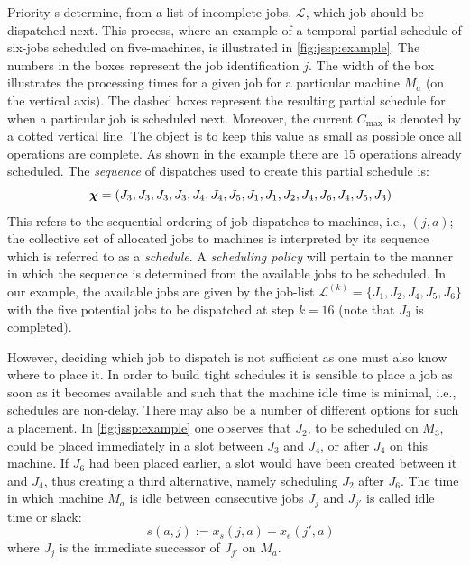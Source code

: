 \documentclass[twocolumn]{svjour3}
\begin{document}
Priority \dr s determine, from a list of incomplete jobs, 
$\mathcal{L}$, which job should be dispatched next. This process, where an 
example of 
a temporal partial schedule of six-jobs scheduled on five-machines, is 
illustrated in \cref{fig:jssp:example}.
The numbers in the boxes represent the job identification $j$. 
The width of the box illustrates the processing times for a given job for a 
particular machine $M_a$ (on the vertical axis). 
The dashed boxes represent the resulting partial schedule for when a particular 
job is scheduled next. 
Moreover, the current $C_{\max}$ is denoted by a dotted vertical line. 
The object is to keep this value as small as possible once all operations are 
complete. As shown in the example there are $15$ operations already scheduled. 
The \textit{sequence} of dispatches used to create this partial schedule is:
\begin{equation}\quad
\bm \chi=\left(J_3,J_3,J_3,J_3,J_4,J_4,J_5,J_1,J_1,J_2,J_4,J_6,J_4,J_5,J_3\right)
\end{equation}
This refers to the sequential ordering of job dispatches to machines, i.e., 
$(j,a)$; 
the collective set of allocated jobs to machines is interpreted by its 
sequence which is referred to as a \emph{schedule}.
A \emph{scheduling policy} will pertain to the manner in which 
the sequence is determined from the available jobs to be scheduled. 
In our example, the available jobs are given by the job-list
$\mathcal{L}^{(k)}=\{J_1,J_2,J_4,J_5,J_6\}$ with the five potential jobs 
to be dispatched at step $k=16$ (note that $J_3$ is completed).

However, deciding which job to dispatch is not sufficient as one must also know 
where to place it. In order to build tight schedules it is sensible to place a 
job as soon as it becomes available and such that the machine idle time is 
minimal, i.e., schedules are non-delay. 
There may also be a number of different options for such a placement. 
In \cref{fig:jssp:example} one observes that $J_2$, to be scheduled on $M_3$, 
could be placed immediately in a slot between $J_3$ and $J_4$, or after $J_4$ 
on this machine. 
If $J_6$ had been placed earlier, a slot would have been created between it and 
$J_4$, thus creating a third alternative, namely scheduling $J_2$ after $J_6$. 
The time in which machine $M_a$ is idle between consecutive jobs $J_j$ and 
$J_{j'}$ is called idle time or slack:
\begin{equation}\quad 
s(a,j):=x_s(j,a)-x_e(j',a) \label{eq:slack}
\end{equation}
where $J_j$ is the immediate successor of $J_{j'}$ on $M_a$. 
\end{document}
